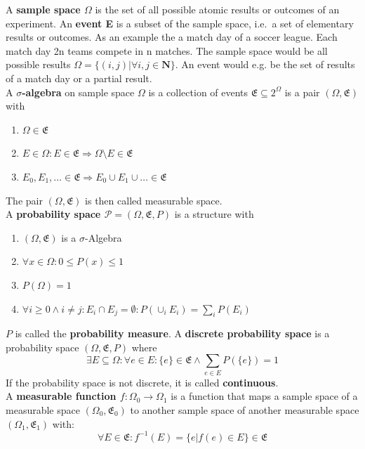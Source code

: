 A \textbf{sample space $\Omega$} is the set of all possible atomic results or outcomes of an experiment. An \textbf{event E} is a subset of the sample space, i.e.~a set of elementary results or outcomes. As an example the a match day of a soccer league. Each match day 2n teams compete in n matches. The sample space would be all possible results $\Omega = \{ (i,j)| \forall i,j \in \mathbf{N}\}$. An event would e.g. be the set of results of a match day or a partial result. \\

A \textbf{$\sigma$-algebra} on sample space $\Omega$ is a collection of events $\mathfrak{E} \subseteq 2^{\Omega}$ is a pair $(\Omega, \mathfrak{E})$ with
\begin{enumerate}
    \item $\Omega \in \mathfrak{E}$
    \item $E \in \Omega: E \in \mathfrak{E} \Rightarrow \Omega \setminus E \in \mathfrak{E}$
    \item $E_0, E_1, \dots \in \mathfrak{E} \Rightarrow E_0 \cup E_1 \cup \dots \in \mathfrak{E}$
\end{enumerate}
The pair $(\Omega, \mathfrak{E})$ is then called measurable space. \\

A \textbf{probability space $\mathcal{P} = (\Omega, \mathfrak{E}, P)$} is a structure with
\begin{enumerate}
    \item $(\Omega, \mathfrak{E})$ is a $\sigma$-Algebra
    \item $\forall x \in \Omega: 0 \leq P(x) \leq 1$
    \item $P(\Omega) = 1$
    \item $\forall i \geq 0 \wedge i \neq j: E_i \cap E_j = \emptyset: P(\cup_i E_i) = \sum_i P(E_i)$ 
\end{enumerate}
$P$ is called the \textbf{probability measure}.
\vspace{0.5cm}
A \textbf{discrete probability space} is a probability space $(\Omega, \mathfrak{E}, P)$ where 
\[ \exists E \subseteq \Omega: \forall e \in E: \{e\} \in \mathfrak{E} \wedge \sum_{e \in E} P(\{e\}) = 1\]
If the probability space is not discrete, it is called \textbf{continuous}. \\

A \textbf{measurable function $f:\Omega_0 \rightarrow \Omega_1$} is a function that maps a sample space of a measurable space $(\Omega_0, \mathfrak{E}_0)$ to another sample space of another measurable space $(\Omega_1, \mathfrak{E}_1)$ with:
\[ \forall E \in \mathfrak{E}: f^{-1}(E) = \{ e | f(e) \in E \} \in \mathfrak{E} \]


